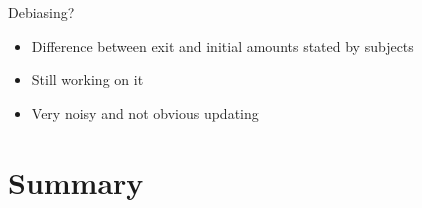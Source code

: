 \documentclass[9pt]{beamer}
\begin{document}
\begin{frame}{Debiasing?}
    \begin{itemize}
        \item Difference between exit and initial amounts stated by subjects 
        \item Still working on it
        \item Very noisy and not obvious updating
    \end{itemize}
     

\end{frame}


\section*{Summary}
\end{document}
